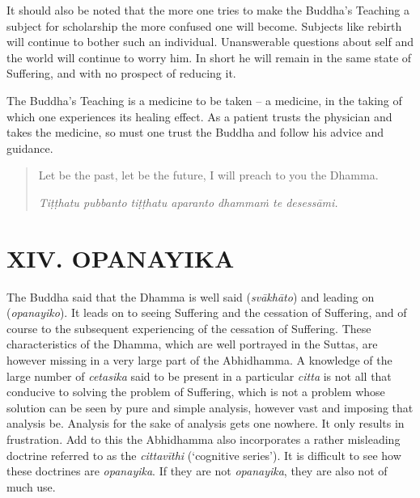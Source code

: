 It should also be noted that the more one tries to make the Buddha's Teaching a subject for scholarship the more confused one will become. Subjects like rebirth will continue to bother such an individual. Unanswerable questions about self and the world will continue to worry him. In short he will remain in the same state of Suffering, and with no prospect of reducing it.

The Buddha's Teaching is a medicine to be taken -- a medicine, in the taking of which one experiences its healing effect. As a patient trusts the physician and takes the medicine, so must one trust the Buddha and follow his advice and guidance.

\begin{quote}
Let be the past, let be the future, I will preach to you the Dhamma.

\textit{Tiṭṭhatu pubbanto tiṭṭhatu aparanto dhammaṁ te desessāmi.}
\end{quote}

\hypertarget{_xiv_opanayika}{%
\section{XIV. OPANAYIKA}\label{_xiv_opanayika}}

The Buddha said that the Dhamma is well said (\textit{svākhāto}) and leading on (\textit{opanayiko}). It leads on to seeing Suffering and the cessation of Suffering, and of course to the subsequent experiencing of the cessation of Suffering. These characteristics of the Dhamma, which are well portrayed in the Suttas, are however missing in a very large part of the Abhidhamma. A knowledge of the large number of \textit{cetasika} said to be present in a particular \textit{citta} is not all that conducive to solving the problem of Suffering, which is not a problem whose solution can be seen by pure and simple analysis, however vast and imposing that analysis be. Analysis for the sake of analysis gets one nowhere. It only results in frustration. Add to this the Abhidhamma also incorporates a rather misleading doctrine referred to as the \textit{cittavīthi} (`cognitive series'). It is difficult to see how these doctrines are \textit{opanayika}. If they are not \textit{opanayika}, they are also not of much use.
